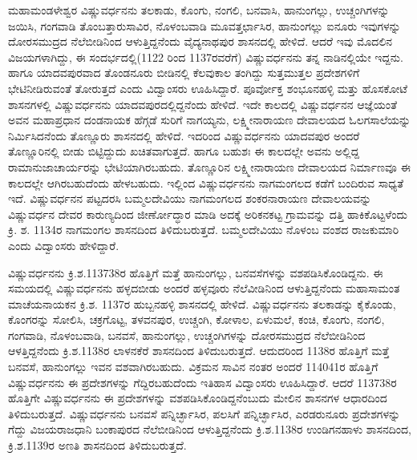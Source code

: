 ಮಹಾಮಂಡಳೇಶ್ವರ ವಿಷ್ಣುವರ್ಧನನು ತಲಕಾಡು, ಕೊಂಗು, ನಂಗಲಿ, ಬನವಾಸಿ, ಹಾನುಂಗಲ್ಲು, ಉಚ್ಚಂಗಿಗಳನ್ನು ಜಯಿಸಿ, ಗಂಗವಾಡಿ ತೊಂಬತ್ತಾರುಸಾವಿರ, ನೊಳಂಬವಾಡಿ ಮೂವತ್ತರ್ಛಾಸಿರ, ಹಾನುಂಗಲ್ಲು ಐನೂರು ಇವುಗಳನ್ನು ದೋರಸಮುದ್ರದ ನೆಲೆಬೀಡಿನಿಂದ ಆಳುತ್ತಿದ್ದನೆಂದು ವೈದ್ಯನಾಥಪುರ ಶಾಸನದಲ್ಲಿ ಹೇಳಿದೆ. ಆದರೆ ಇವು ಮೊದಲಿನ ವಿಜಯಗಳಾಗಿದ್ದು, ಈ ಸಂದರ್ಭದಲ್ಲಿ(1122 ರಿಂದ 1137ರವರೆಗೆ) ವಿಷ್ಣುವರ್ಧನನು ತನ್ನ ನಾಡಿನಲ್ಲಿಯೇ ಇದ್ದನು. ಹಾಗೂ ಯಾದವಪುರವಾದ ತೊಂಡನೂರು ಬೀಡಿನಲ್ಲಿ ಕೆಲವುಕಾಲ ತಂಗಿದ್ದು ಸುತ್ತಮುತ್ತಲ ಪ್ರದೇಶಗಳಿಗೆ ಭೇಟಿನೀಡಿರುವಂತೆ ತೋರುತ್ತದೆ ಎಂದು ವಿದ್ವಾಂಸರು ಊಹಿಸಿದ್ದಾರೆ. ಪೂರ್ವೋಕ್ತ ಶಂಭೂನಹಳ್ಳಿ ಮತ್ತು ಹೊಸಕೋಟೆ ಶಾಸನಗಳಲ್ಲಿ ವಿಷ್ಣುವರ್ಧನನು ಯಾದವಪುರದಲ್ಲಿದ್ದನೆಂದು ಹೇಳಿದೆ. ಇದೇ ಕಾಲದಲ್ಲಿ ವಿಷ್ಣುವರ್ಧನನ ಆಜ್ಞೆಯಂತೆ ಅವನ ಮಹಾಪ್ರಧಾನ ದಂಡನಾಯಕ ಹೆಗ್ಗಡೆ ಸುರಿಗೆ ನಾಗಯ್ಯನು, ಲಕ್ಷ್ಮೀನಾರಾಯಣ ದೇವಾಲಯದ ಓಲಗಸಾಲೆಯನ್ನು ನಿರ್ಮಿಸಿದನೆಂದು ತೊಣ್ಣೂರು ಶಾಸನದಲ್ಲಿ ಹೇಳಿದೆ. ಇದರಿಂದ ವಿಷ್ಣುವರ್ಧನನು ಯಾದವಪುರ ಅಂದರೆ ತೊಣ್ಣೂರಿನಲ್ಲಿ ಬೀಡು ಬಿಟ್ಟಿದ್ದುದು ಖಚಿತವಾಗುತ್ತದೆ. ಹಾಗೂ ಬಹುಶಃ ಈ ಕಾಲದಲ್ಲೇ ಅವನು ಅಲ್ಲಿದ್ದ ರಾಮಾನುಜಾಚಾರ್ಯರನ್ನು ಭೇಟಿಯಾಗಿರಬಹುದು. ತೊಣ್ಣೂರಿನ ಲಕ್ಷ್ಮೀನಾರಾಯಣ ದೇವಾಲಯದ ನಿರ್ಮಾಣವೂ ಈ ಕಾಲದಲ್ಲೇ ಆಗಿರಬಹುದೆಂದು ಹೇಳಬಹುದು. ಇಲ್ಲಿಂದ ವಿಷ್ಣುವರ್ಧನನು ನಾಗಮಂಗಲದ ಕಡೆಗೆ ಬಂದಿರುವ ಸಾಧ್ಯತೆ ಇದೆ. ವಿಷ್ಣುವರ್ಧನನ ಪಟ್ಟದರಸಿ ಬಮ್ಮಲದೇವಿಯು ನಾಗಮಂಗಲದ ಶಂಕರನಾರಾಯಣ ದೇವಾಲಯವನ್ನು ವಿಷ್ಣುವರ್ಧನ ದೇವರ ಕಾರುಣ್ಯದಿಂದ ಜೀರ್ಣೋದ್ಧಾರ ಮಾಡಿ ಅದಕ್ಕೆ ಅರಿಕನಕಟ್ಟ ಗ್ರಾಮವನ್ನು ದತ್ತಿ ಹಾಕಿಕೊಟ್ಟಳೆಂದು ಕ್ರಿ. ಶ. 1134ರ ನಾಗಮಂಗಲ ಶಾಸನದಿಂದ ತಿಳಿದುಬರುತ್ತದೆ. ಬಮ್ಮಲದೇವಿಯು ನೊಳಂಬ ವಂಶದ ರಾಜಕುಮಾರಿ ಎಂದು ವಿದ್ವಾಂಸರು ಹೇಳಿದ್ದಾರೆ.

ವಿಷ್ಣುವರ್ಧನನು ಕ್ರಿ.ಶ.1137\enginline{-}38ರ ಹೊತ್ತಿಗೆ ಮತ್ತೆ ಹಾನುಂಗಲ್ಲು, ಬನವಸೆಗಳನ್ನು ವಶಪಡಿಸಿಕೊಂಡಿದ್ದನು. ಈ ಸಮಯ\-ದಲ್ಲಿ ವಿಷ್ಣುವರ್ಧನನು ಹಳ್ಳದಬೀಡು ಅಂದರೆ ಹಳ್ಳವೂರು ನೆಲೆವೀಡಿನಿಂದ ಆಳುತ್ತಿದ್ದನೆಂದು ಮಹಾಸಾಮಂತ ಮಾಚೆಯನಾಯಕನ ಕ್ರಿ.ಶ. 1137ರ ಹುಬ್ಬನಹಳ್ಳಿ ಶಾಸನದಲ್ಲಿ ಹೇಳಿದೆ. ವಿಷ್ಣುವರ್ಧನನು ತಲಕಾಡನ್ನು ಕೈಕೊಂಡು, ಕೊಂಗರನ್ನು ಸೋಲಿಸಿ, ಚಕ್ರಗೊಟ್ಟ, ತಳವನಪುರ, ಉಚ್ಚಂಗಿ, ಕೋಳಾಲ, ಏಳುಮಲೆ, ಕಂಚಿ, ಕೊಂಗು, ನಂಗಲಿ, ಗಂಗವಾಡಿ, ನೊಳಂಬವಾಡಿ, ಬನವಸೆ, ಹಾನುಂಗಲ್ಲು, ಉಚ್ಚಂಗಿಗಳನ್ನು ದೋರಸಮುದ್ರದ ನೆಲೆಬೀಡಿನಿಂದ ಆಳತ್ತಿದ್ದನೆಂದು ಕ್ರಿ.ಶ.1138ರ ಲಾಳನಕೆರೆ ಶಾಸನದಿಂದ ತಿಳಿದುಬರುತ್ತದೆ. ಆದುದರಿಂದ 1138ರ ಹೊತ್ತಿಗೆ ಮತ್ತೆ ಬನವಸೆ, ಹಾನುಂಗಲ್ಲು ಇವನ ವಶವಾಗಿರಬಹುದು. ವಿಕ್ರಮನ ಸಾವಿನ ನಂತರ ಅಂದರೆ 1140\enginline{-}41ರ ಹೊತ್ತಿಗೆ ವಿಷ್ಣುವರ್ಧನನು ಈ ಪ್ರದೇಶಗಳನ್ನು ಗೆದ್ದಿರಬಹುದೆಂದು ಇತಿಹಾಸ ವಿದ್ವಾಂಸರು ಊಹಿಸಿದ್ದಾರೆ. ಆದರೆ 1137\enginline{-}38ರ ಹೊತ್ತಿಗೇ ವಿಷ್ಣುವರ್ಧನನು ಈ ಪ್ರದೇಶಗಳನ್ನು ವಶಪಡಿಸಿಕೊಂಡಿದ್ದನೆಂಬುದು ಮೇಲಿನ ಶಾಸನಗಳ ಆಧಾರದಿಂದ ತಿಳಿದುಬರುತ್ತದೆ. ವಿಷ್ಣುವರ್ಧನನು ಬನವಸೆ ಪನ್ನಿರ್ಚ್ಛಾಸಿರ, ಪಲಸಿಗೆ ಪನ್ನಿರ್ಚ್ಛಾಸಿರ, ಎರಡರುನೂರು ಪ್ರದೇಶಗಳನ್ನು ಗೆದ್ದು ವಿಜಯರಾಜಧಾನಿ ಬಂಕಾಪುರದ ನೆಲೆಬೀಡಿನಿಂದ ಆಳುತ್ತಿದ್ದ\-ನೆಂದು ಕ್ರಿ.ಶ.1138ರ ಉಂಡಿಗನಹಾಳು ಶಾಸನದಿಂದ, ಕ್ರಿ.ಶ.1139ರ ಅಣತಿ ಶಾಸನದಿಂದ ತಿಳಿದುಬರುತ್ತದೆ.

